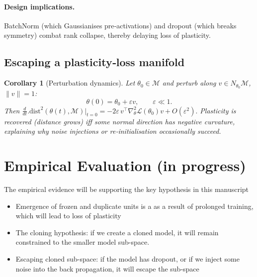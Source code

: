 \documentclass{article}
\newcommand{\Loss}{\mathcal{L}}
\newtheorem{corollary}{Corollary}[section]
\begin{document}
\paragraph{Design implications.}
BatchNorm (which Gaussianises pre‑activations) and dropout (which breaks symmetry) combat rank collapse, thereby delaying loss of plasticity.

\subsection{Escaping a plasticity‑loss manifold}

\begin{corollary}[Perturbation dynamics]
\label{cor:perturb}
Let $\theta_0\in\mathcal{M}$ and perturb along $v\in N_{\theta_0}\mathcal{M}$, $\|v\|=1$:
\[
\theta(0)=\theta_0+\varepsilon v,\qquad \varepsilon\ll1.
\]
Then
\(
\frac{d}{dt}\bigl.\mathrm{dist}^2(\theta(t),\mathcal{M})\bigr|_{t=0}
=-2\varepsilon\,v^\top\nabla_\theta^2\Loss(\theta_0)v+O(\varepsilon^2).
\)
Plasticity is recovered (distance grows) iff some normal direction has negative curvature, explaining why noise injections or re‑initialisation occasionally succeed.
\end{corollary}

\section{Empirical Evaluation (in progress)}
\label{sec:experiments}

The empirical evidence will be supporting the key hypothesis in this manuscript 
\begin{itemize}
    \item Emergence of frozen and duplicate units is a as a result of prolonged training, which will lead  to loss of plasticity 
    \item The cloning hypothesis: if we create a cloned model, it will remain constrained to the smaller model sub-space.
    \item Escaping cloned sub-space: if the model has dropout, or if we inject some noise into the back propagation, it will escape the sub-space 
\end{itemize}
\end{document}
